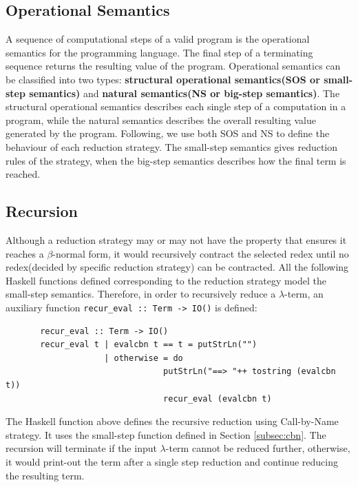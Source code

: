 \subsection*{Operational Semantics}

A sequence of computational steps of a valid program is the operational semantics for the programming language. The final step of a terminating sequence returns the resulting value of the program. Operational semantics can be classified into two types: \textbf{structural operational semantics(SOS or small-step semantics)} and \textbf{natural semantics(NS or big-step semantics)}. The structural operational semantics describes each single step of a computation in a program, while the natural semantics describes the overall resulting value generated by the program. Following, we use both SOS and NS to define the behaviour of each reduction strategy. The small-step semantics gives reduction rules of the strategy, when the big-step semantics describes how the final term is reached.  

\subsection*{Recursion}

Although a reduction strategy may or may not have the property that ensures it reaches a $\beta$-normal form, it would recursively contract the selected redex until no redex(decided by specific reduction strategy) can be contracted. All the following Haskell functions defined corresponding to the reduction strategy model the small-step semantics. Therefore, in order to recursively reduce a $\lambda$-term, an auxiliary function \verb|recur_eval :: Term -> IO()| is defined:

\begin{verbatim}
       recur_eval :: Term -> IO()
       recur_eval t | evalcbn t == t = putStrLn("")
                    | otherwise = do
                                putStrLn("==> "++ tostring (evalcbn t))
                                recur_eval (evalcbn t)
\end{verbatim}

The Haskell function above defines the recursive reduction using Call-by-Name strategy. It uses the small-step function defined in Section \ref{subsec:cbn}. The recursion will terminate if the input $\lambda$-term cannot be reduced further, otherwise, it would print-out the term after a single step reduction and continue reducing the resulting term.



